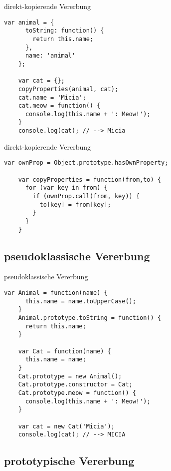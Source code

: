 \begin{frame}[fragile]{direkt-kopierende Vererbung}
  \begin{lstlisting}[gobble=4]
    var animal = {
      toString: function() {
        return this.name;
      },
      name: 'animal'
    };
      
    var cat = {};
    copyProperties(animal, cat);
    cat.name = 'Micia';
    cat.meow = function() {
      console.log(this.name + ': Meow!');
    }
    console.log(cat); // --> Micia
  \end{lstlisting}
\end{frame}

\begin{frame}[fragile]{direkt-kopierende Vererbung}
  \begin{lstlisting}[gobble=4]
    var ownProp = Object.prototype.hasOwnProperty;
  
    var copyProperties = function(from,to) {
      for (var key in from) {
        if (ownProp.call(from, key)) {
          to[key] = from[key];
        }
      }
    }
  \end{lstlisting}
\end{frame}

\subsection{pseudoklassische Vererbung}

\lstset{basicstyle=\ttfamily\scriptsize}

\begin{frame}[fragile]{pseudoklassische Vererbung}
  \begin{lstlisting}[gobble=4]
    var Animal = function(name) {
      this.name = name.toUpperCase();
    }
    Animal.prototype.toString = function() {
      return this.name;
    }
    
    var Cat = function(name) {
      this.name = name;
    }
    Cat.prototype = new Animal();
    Cat.prototype.constructor = Cat;
    Cat.prototype.meow = function() {
      console.log(this.name + ': Meow!');
    }
    
    var cat = new Cat('Micia');
    console.log(cat); // --> MICIA
  \end{lstlisting}
\end{frame}

\subsection{prototypische Vererbung}

